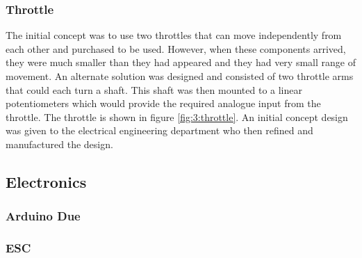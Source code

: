 		\subsubsection{Throttle}
		The initial concept was to use two throttles that can move independently from each other and %
		purchased to be used. However, when these components arrived, they were much smaller than they had appeared and they had very small range of movement. An alternate solution was designed and consisted of two throttle arms that could each turn a shaft. This shaft was then mounted to a linear potentiometers which would provide the required analogue input from the throttle. The throttle is shown in figure \ref{fig:3:throttle}. An initial concept design was given to the electrical engineering department who then refined and manufactured the design. 
		\par
	\subsection{Electronics}\par
		\subsubsection{Arduino Due}\par
		\subsubsection{ESC}\par
